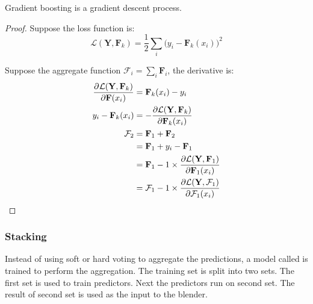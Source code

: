 \begin{theorem}
    Gradient boosting is a gradient descent process.
\end{theorem}
\begin{proof}
    Suppose the loss function is:
\begin{equation}
	\mathcal{L}(\mathbf{Y},\mathbf{F}_k) = \frac{1}{2} \sum_i \Big ( y_i - \mathbf{F}_k (x_i) \Big )^2
\end{equation}

Suppose the aggregate function $\mathcal{F}_i = \sum\limits_i \mathbf{F}_i $, the derivative is:
\begin{equation}
	\begin{aligned}
	   \dpd{\mathcal{L}(\mathbf{Y},\mathbf{F}_k)}{\mathbf{F}(x_i)}	  &= \mathbf{F}_k (x_i) - y_i \\
		y_i - \mathbf{F}_k (x_i) &= - \frac{\partial \mathcal{L}(\mathbf{Y},\mathbf{F}_k )}{\partial \mathbf{F}_k (x_i)}\\
		\mathcal{F}_2 &= \mathbf{F}_1 + \mathbf{F}_2 \\
		&= \mathbf{F}_1 + y_i - \mathbf{F}_1 \\
		&= \mathbf{F}_1 - 1 \times \frac{\partial \mathcal{L}(\mathbf{Y},\mathbf{F}_1 )}{\partial \mathbf{F}_1 (x_i)} \\
		&= \mathcal{F}_1 - 1 \times \frac{\partial \mathcal{L}(\mathbf{Y},\mathcal{F}_1 )}{\partial \mathcal{F}_1 (x_i)} 
	\end{aligned}
\end{equation}
\end{proof}




\subsubsection{Stacking}

Instead of using soft or hard voting to aggregate the predictions, a model called  is trained to perform the aggregation. The training set is split into two sets. The first set is used to train predictors. Next the predictors run on second set. The result of second set is used as the input to the blender.













